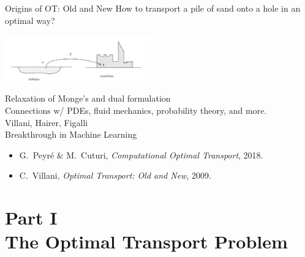 \documentclass[pdf,aspectratio=169,10pt]{beamer}
\begin{document}
\begin{frame}{Origins of OT: Old and New }
 How to transport a pile of sand onto a hole in an optimal way?

  \begin{center}
  \includegraphics[height=2cm]{../img/deblais}\vspace{0.2cm}
  \end{center}

 Relaxation of Monge's and dual formulation\\


 Connections w/ PDEs, fluid mechanics,
probability theory, and more. \\

  Villani, Hairer, Figalli\\

 Breakthrough in Machine Learning\\
\vspace{1em}
\begin{itemize}
    \item G.~Peyré \& M.~Cuturi, \emph{Computational Optimal Transport}, 2018.
    \item C.~Villani, \emph{Optimal Transport: Old and New}, 2009.
\end{itemize}
\end{frame}



\section{Part I\\ The Optimal Transport Problem}


\begin{frame}
    \Large {}
\end{frame}
\end{document}
